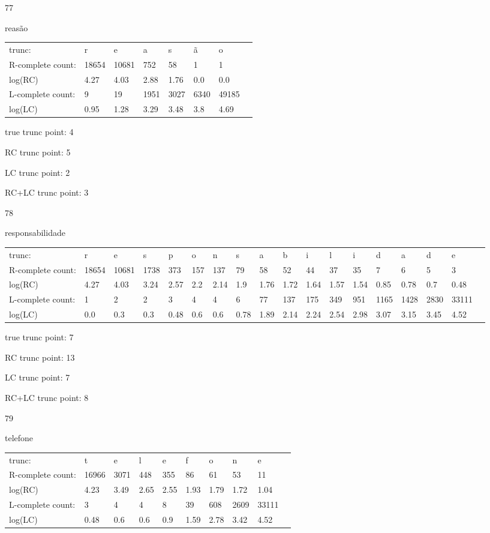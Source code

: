 \documentclass{article}
\begin{document}
77

reasão

\begin{tabular}{l|lllllll}
trunc: & r & e & a & s & ã & o & \\ 
R-complete count: & 18654 & 10681 & 752 & 58 & 1 & 1 & \\ 
log(RC) & 4.27 & 4.03 & 2.88 & 1.76 & 0.0 & 0.0 & \\ 
L-complete count: & 9 & 19 & 1951 & 3027 & 6340 & 49185 & \\ 
log(LC) & 0.95 & 1.28 & 3.29 & 3.48 & 3.8 & 4.69 & \\ 
\end{tabular}

true trunc point: 4

RC trunc point: 5

LC trunc point: 2

RC+LC trunc point: 3

\vspace{1em}

78

responsabilidade

\begin{tabular}{l|lllllllllllllllll}
trunc: & r & e & s & p & o & n & s & a & b & i & l & i & d & a & d & e & \\ 
R-complete count: & 18654 & 10681 & 1738 & 373 & 157 & 137 & 79 & 58 & 52 & 44 & 37 & 35 & 7 & 6 & 5 & 3 & \\ 
log(RC) & 4.27 & 4.03 & 3.24 & 2.57 & 2.2 & 2.14 & 1.9 & 1.76 & 1.72 & 1.64 & 1.57 & 1.54 & 0.85 & 0.78 & 0.7 & 0.48 & \\ 
L-complete count: & 1 & 2 & 2 & 3 & 4 & 4 & 6 & 77 & 137 & 175 & 349 & 951 & 1165 & 1428 & 2830 & 33111 & \\ 
log(LC) & 0.0 & 0.3 & 0.3 & 0.48 & 0.6 & 0.6 & 0.78 & 1.89 & 2.14 & 2.24 & 2.54 & 2.98 & 3.07 & 3.15 & 3.45 & 4.52 & \\ 
\end{tabular}

true trunc point: 7

RC trunc point: 13

LC trunc point: 7

RC+LC trunc point: 8

\vspace{1em}

79

telefone

\begin{tabular}{l|lllllllll}
trunc: & t & e & l & e & f & o & n & e & \\ 
R-complete count: & 16966 & 3071 & 448 & 355 & 86 & 61 & 53 & 11 & \\ 
log(RC) & 4.23 & 3.49 & 2.65 & 2.55 & 1.93 & 1.79 & 1.72 & 1.04 & \\ 
L-complete count: & 3 & 4 & 4 & 8 & 39 & 608 & 2609 & 33111 & \\ 
log(LC) & 0.48 & 0.6 & 0.6 & 0.9 & 1.59 & 2.78 & 3.42 & 4.52 & \\ 
\end{tabular}
\end{document}
